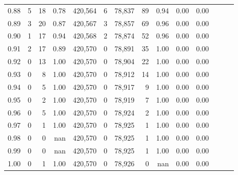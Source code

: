 \begin{tabular}{rrrrrrrrrrrrrr}
0.88 &       5 &     18 &  0.78 &  420,564 &        6 &  78,837 &      89 &  0.94 &  0.00 &      0.00 \\
0.89 &       3 &     20 &  0.87 &  420,567 &        3 &  78,857 &      69 &  0.96 &  0.00 &      0.00 \\
0.90 &       1 &     17 &  0.94 &  420,568 &        2 &  78,874 &      52 &  0.96 &  0.00 &      0.00 \\
0.91 &       2 &     17 &  0.89 &  420,570 &        0 &  78,891 &      35 &  1.00 &  0.00 &      0.00 \\
0.92 &       0 &     13 &  1.00 &  420,570 &        0 &  78,904 &      22 &  1.00 &  0.00 &      0.00 \\
0.93 &       0 &      8 &  1.00 &  420,570 &        0 &  78,912 &      14 &  1.00 &  0.00 &      0.00 \\
0.94 &       0 &      5 &  1.00 &  420,570 &        0 &  78,917 &       9 &  1.00 &  0.00 &      0.00 \\
0.95 &       0 &      2 &  1.00 &  420,570 &        0 &  78,919 &       7 &  1.00 &  0.00 &      0.00 \\
0.96 &       0 &      5 &  1.00 &  420,570 &        0 &  78,924 &       2 &  1.00 &  0.00 &      0.00 \\
0.97 &       0 &      1 &  1.00 &  420,570 &        0 &  78,925 &       1 &  1.00 &  0.00 &      0.00 \\
0.98 &       0 &      0 &   nan &  420,570 &        0 &  78,925 &       1 &  1.00 &  0.00 &      0.00 \\
0.99 &       0 &      0 &   nan &  420,570 &        0 &  78,925 &       1 &  1.00 &  0.00 &      0.00 \\
1.00 &       0 &      1 &  1.00 &  420,570 &        0 &  78,926 &       0 &   nan &  0.00 &      0.00 \\
\bottomrule
\end{tabular}
